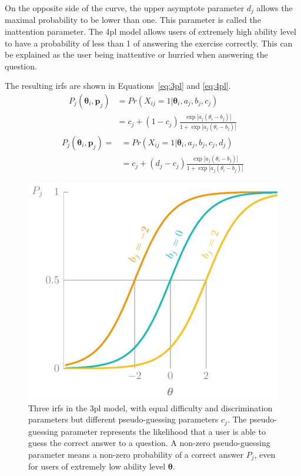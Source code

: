On the opposite side of the curve, the upper asymptote parameter $d_j$ allows the maximal probability to be lower than one. 
This parameter is called the inattention parameter. 
The \gls{4pl} model allows users of extremely high ability level to have a probability of less than 1 of answering the exercise correctly.
This can be explained as the user being inattentive or hurried when answering the question.

The resulting \glspl{irf} are shown in Equations~\ref{eq:3pl} and \ref{eq:4pl}.
\begin{equation}
\begin{split}
    \label{eq:3pl}
    P_{j}(\bm{\theta}_i,\bm{p}_j)
    & = Pr(X_{ij} = 1 | \bm{\theta}_i,a_j,b_j,c_j) \\
    & = c_j + (1-c_j) \frac{\exp\big[a_j(\theta_i - b_j)\big]}{1 + \exp\big[a_j(\theta_i - b_j)\big]}
\end{split}
\end{equation}
\begin{equation}
\begin{split}
    \label{eq:4pl}
    P_{j}(\bm{\theta}_i,\bm{p}_j) =
    & = Pr(X_{ij} = 1 | \bm{\theta}_i,a_j,b_j,c_j,d_j)\\
    & = c_j + (d_j-c_j) \frac{\exp\big[a_j(\theta_i - b_j)\big]}{1 + \exp\big[a_j(\theta_i - b_j)\big]}
\end{split}
\end{equation}

\begin{figure}
    \centering
    \includegraphics[page=4]{03-education/figures/tikzfigures.pdf}
    \caption[Item response functions of the 3PL model]{Three \glspl{irf} in the \gls{3pl} model, with equal difficulty and discrimination parameters but different pseudo-guessing parameters $c_j$. The pseudo-guessing parameter represents the likelihood that a user is able to guess the correct answer to a question. A non-zero pseudo-guessing parameter means a non-zero probability of a correct answer $P_j$, even for users of extremely low ability level $\bm\theta$.}
    \label{fig:3pl}
\end{figure}

